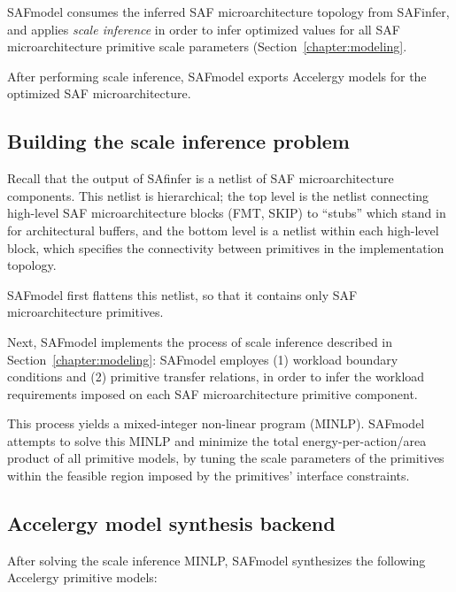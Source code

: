 SAFmodel consumes the inferred SAF microarchitecture topology from SAFinfer, and applies \textit{scale inference} in order to infer optimized values for all SAF microarchitecture primitive scale parameters (Section~\ref{chapter:modeling}.

After performing scale inference, SAFmodel exports Accelergy models for the optimized SAF microarchitecture.

\subsection{Building the scale inference problem}

Recall that the output of SAfinfer is a netlist of SAF microarchitecture components. This netlist is hierarchical; the top level is the netlist connecting high-level SAF microarchitecture blocks (FMT, SKIP) to ``stubs'' which stand in for architectural buffers, and the bottom level is a netlist within each high-level block, which specifies the connectivity between primitives in the implementation topology.

SAFmodel first flattens this netlist, so that it contains only SAF microarchitecture primitives.

Next, SAFmodel implements the process of scale inference described in Section~\ref{chapter:modeling}: SAFmodel employes (1) workload boundary conditions and (2) primitive transfer relations, in order to infer the workload requirements imposed on each SAF microarchitecture primitive component.

This process yields a mixed-integer non-linear program (MINLP). SAFmodel attempts to solve this MINLP and minimize the total energy-per-action/area product of all primitive models, by tuning the scale parameters of the primitives within the feasible region imposed by the primitives' interface constraints.

\subsection{Accelergy model synthesis backend}

After solving the scale inference MINLP, SAFmodel synthesizes the following Accelergy primitive models:

